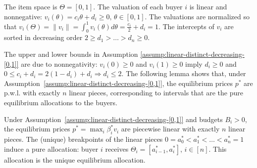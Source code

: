 \begin{assumption}
	The item space is $\Theta = [0,1]$. 
	The valuation of each buyer $i$ is linear and nonnegative: 
	$v_i(\theta) = c_i \theta + d_i \geq 0, \, \theta\in [0,1]$.
	The valuations are normalized so that
	$v_i(\Theta) = \|v_i\| = \int_0^1 v_i(\theta) d\theta = \frac{c_i}{2} + d_i = 1$.
	The intercepts of $v_i$ are sorted in decreasing order
	$2 \geq d_1 > \dots > d_n \geq 0$.
	\label{assump:linear-distinct-decreasing-[0,1]}
\end{assumption}
The upper and lower bounds in Assumption \ref{assump:linear-distinct-decreasing-[0,1]} are due to nonnegativity: $v_i(0) \geq 0$ and $v_i(1) \geq 0$ imply $d_i \geq 0$ and $0 \leq c_i + d_i = 2(1-d_i) + d_i \Rightarrow d_i \leq 2$. The following lemma shows that, under Assumption~\ref{assump:linear-distinct-decreasing-[0,1]}, the equilibrium prices $p^*$ are p.w.l. with exactly $n$ linear pieces, corresponding to intervals that are the pure equilibrium allocations to the buyers.
\begin{lemma}
	Under Assumption~\ref{assump:linear-distinct-decreasing-[0,1]} and budgets $B_i > 0$, the equilibrium prices $p^* = \max_i \beta^*_i v_i$ are piecewise linear with exactly $n$ linear pieces.
	The (unique) breakpoints of the linear pieces $0 = a^*_0 < a^*_1 < \dots < a^*_n = 1$ induce a pure allocation: buyer $i$ receives $\Theta_i = [a^*_{i-1}, a^*_i]$, $i\in [n]$. This allocation is the unique equilibrium allocation.
	\label{lemma:all-linear-equilibrium-geometry}
\end{lemma}	
